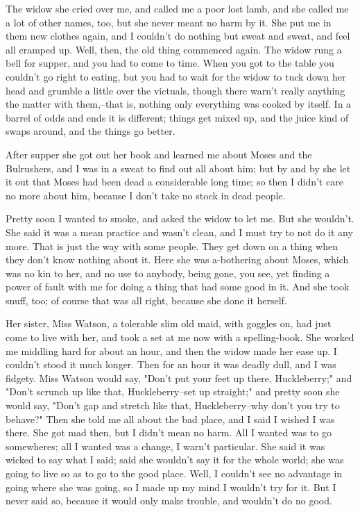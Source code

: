 The widow she cried over me, and called me a poor lost lamb, and she
called me a lot of other names, too, but she never meant no harm by it.
She put me in them new clothes again, and I couldn't do nothing but sweat
and sweat, and feel all cramped up.  Well, then, the old thing commenced
again.  The widow rung a bell for supper, and you had to come to time.
When you got to the table you couldn't go right to eating, but you had to
wait for the widow to tuck down her head and grumble a little over the
victuals, though there warn't really anything the matter with them,--that
is, nothing only everything was cooked by itself.  In a barrel of odds
and ends it is different; things get mixed up, and the juice kind of
swaps around, and the things go better.

After supper she got out her book and learned me about Moses and the
Bulrushers, and I was in a sweat to find out all about him; but by and by
she let it out that Moses had been dead a considerable long time; so then
I didn't care no more about him, because I don't take no stock in dead
people.

Pretty soon I wanted to smoke, and asked the widow to let me.  But she
wouldn't.  She said it was a mean practice and wasn't clean, and I must
try to not do it any more.  That is just the way with some people.  They
get down on a thing when they don't know nothing about it.  Here she was
a-bothering about Moses, which was no kin to her, and no use to anybody,
being gone, you see, yet finding a power of fault with me for doing a
thing that had some good in it.  And she took snuff, too; of course that
was all right, because she done it herself.

Her sister, Miss Watson, a tolerable slim old maid, with goggles on,
had just come to live with her, and took a set at me now with a
spelling-book. She worked me middling hard for about an hour, and then
the widow made her ease up.  I couldn't stood it much longer.  Then for
an hour it was deadly dull, and I was fidgety.  Miss Watson would say,
"Don't put your feet up there, Huckleberry;" and "Don't scrunch up like
that, Huckleberry--set up straight;" and pretty soon she would say,
"Don't gap and stretch like that, Huckleberry--why don't you try to
behave?"  Then she told me all about the bad place, and I said I wished I
was there. She got mad then, but I didn't mean no harm.  All I wanted was
to go somewheres; all I wanted was a change, I warn't particular.  She
said it was wicked to say what I said; said she wouldn't say it for the
whole world; she was going to live so as to go to the good place.  Well,
I couldn't see no advantage in going where she was going, so I made up my
mind I wouldn't try for it.  But I never said so, because it would only
make trouble, and wouldn't do no good.

